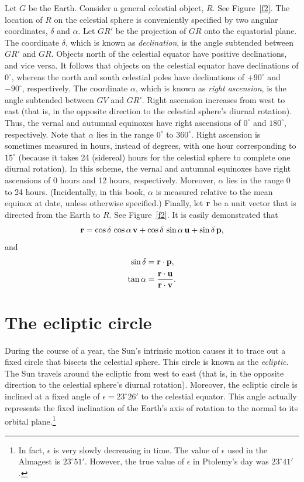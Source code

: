 Let $G$ be the Earth. Consider a general celestial object, $R$. See Figure~\ref{f2}. The location of $R$ on the celestial sphere
is conveniently specified by  two angular coordinates, $\delta$ and $\alpha$. Let $GR'$ be the
projection of $GR$ onto the equatorial plane. The coordinate $\delta$, which is known as  {\em declination}, is  the angle subtended between $GR'$ and $GR$. Objects north of the celestial equator have positive
declinations, and vice versa. It follows that objects on the celestial equator have declinations of $0^\circ$,
whereas the north and south celestial poles have declinations of $+90^\circ$ and $-90^\circ$, respectively.
The coordinate $\alpha$, which is known as  {\em right ascension}, is the angle subtended between 
$GV$ and $GR'$. Right ascension increases from west to east (that is, in the opposite direction to the
celestial sphere's diurnal rotation). Thus, the vernal and autumnal equinoxes have right ascensions of $0^\circ$ and $180^\circ$, respectively. Note that $\alpha$ lies in the range $0^\circ$ to
$360^\circ$. Right ascension is sometimes measured in hours, instead of degrees, with one hour corresponding to
$15^\circ$ (because it takes 24 (sidereal) hours for the celestial sphere to complete
one diurnal rotation). In this scheme, the vernal and autumnal equinoxes
have right ascensions of 0 hours and 12 hours, respectively. Moreover, $\alpha$ lies in the
range 0  to 24 hours. (Incidentally, in this book, $\alpha$ is measured
relative to the mean equinox at date, unless otherwise specified.)
Finally, let ${\bf r}$ be a unit vector that is directed from the Earth to $R$. See Figure~\ref{f2}. It is easily
demonstrated that 
\begin{equation}\label{e1}
{\bf r} = \cos\delta\,\cos\alpha\,{\bf v} + 
\cos\delta\,\sin\alpha\,{\bf u} + \sin\delta\,{\bf p},
\end{equation}
and
\begin{align}\label{e2}
\sin\delta &= {\bf r}\cdot {\bf p},\\[0.5ex]
\tan\alpha &= \frac{{\bf r}\cdot{\bf u}}{{\bf r}\cdot {\bf v}}.\label{e3}
\end{align}

\section{The ecliptic circle}
During the course of a year, the Sun's intrinsic motion causes it to trace out a fixed circle that bisects the celestial sphere. This circle is known as the {\em ecliptic}. The Sun travels around the ecliptic from west to east (that is, in the opposite direction
to the celestial sphere's diurnal rotation). Moreover, the ecliptic circle is inclined at a fixed angle of $\epsilon = 23^\circ 26'$ to the celestial equator.
This angle actually represents the fixed inclination of the Earth's axis of rotation to the normal to its orbital
plane.\footnote{In fact, $\epsilon$ is very slowly decreasing in time. The value of
$\epsilon$ used in  the Almagest is $23^\circ 51'$. However, the true value of $\epsilon$  in Ptolemy's day was $23^\circ 41'$.}

